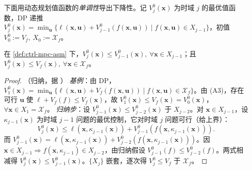 下面用动态规划值函数的\emph{单调性}导出下降性。记 $V_j^0(\mathbf{x})$ 为时域 $j$ 的最优值函数，DP 递推 $V_j^0(\mathbf{x})=\min_{\mathbf{u}}\{\ell(\mathbf{x},\mathbf{u})+V_{j-1}^0(f(\mathbf{x},\mathbf{u}))\mid f(\mathbf{x},\mathbf{u})\in X_{j-1}\}$，初值 $V_0^0:=V_f,\ X_0:=\mathcal{X}_f$。

\begin{proposition}[值函数单调性]
\label{prop:ctrl-mono}
在 \cref{def:ctrl-mpc-asm} 下，$V_j^0(\mathbf{x})\le V_{j-1}^0(\mathbf{x}),\ \forall\mathbf{x}\in X_{j-1}$；且 $V_j^0(\mathbf{x})\le V_f(\mathbf{x}),\ \forall\mathbf{x}\in\mathcal{X}_f$\cite{rawlings2020mpc}。
\end{proposition}
\begin{proof}（归纳，据 \cite{rawlings2020mpc}）
\emph{基例}：由 DP，$V_1^0(\mathbf{x})=\min_{\mathbf{u}}\{\ell(\mathbf{x},\mathbf{u})+V_f(f(\mathbf{x},\mathbf{u}))\mid f(\mathbf{x},\mathbf{u})\in\mathcal{X}_f\}$。由 (A3)，存在可行 $\mathbf{u}$ 使 $\ell+V_f(f)\le V_f(\mathbf{x})$，故 $V_1^0(\mathbf{x})\le V_f(\mathbf{x})=V_0^0(\mathbf{x})$，$\forall\mathbf{x}\in X_1=\mathcal{X}_f$。
\emph{归纳步}：设 $V_{j-1}^0(\mathbf{x})\le V_{j-2}^0(\mathbf{x})$ 于 $X_{j-2}$。对 $\mathbf{x}\in X_{j-1}$，设 $\kappa_{j-1}(\mathbf{x})$ 为时域 $j-1$ 问题的最优控制，它对时域 $j$ 问题可行（给上界）：
\[
  V_j^0(\mathbf{x})\le\ell(\mathbf{x},\kappa_{j-1}(\mathbf{x}))+V_{j-1}^0(f(\mathbf{x},\kappa_{j-1}(\mathbf{x}))).
\]
而 $V_{j-1}^0(\mathbf{x})=\ell(\mathbf{x},\kappa_{j-1}(\mathbf{x}))+V_{j-2}^0(f(\mathbf{x},\kappa_{j-1}(\mathbf{x})))$。因 $\mathbf{x}\in X_{j-1}\Rightarrow f(\mathbf{x},\kappa_{j-1})\in X_{j-2}$，由归纳假设 $V_{j-1}^0(f)\le V_{j-2}^0(f)$。两式相减得 $V_j^0(\mathbf{x})\le V_{j-1}^0(\mathbf{x})$。$\{X_j\}$ 嵌套，逐次得 $V_j^0\le V_f$ 于 $\mathcal{X}_f$。
\end{proof}

